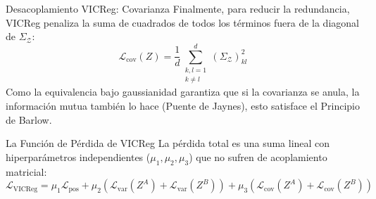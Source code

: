 \documentclass[aspectratio=169, 12pt]{beamer}
\begin{document}
\begin{frame}{Desacoplamiento VICReg: Covarianza}
Finalmente, para reducir la redundancia, VICReg penaliza la suma de cuadrados de todos los términos fuera de la diagonal de $\Sigma_\mathcal{Z}$:
\[
    \mathcal{L}_{\text{cov}}(Z) = \frac{1}{d} \sum_{\substack{k,l=1 \\ k \neq l}}^{d} (\Sigma_\mathcal{Z})_{kl}^2
\]
Como la equivalencia bajo gaussianidad garantiza que si la covarianza se anula, la información mutua también lo hace (Puente de Jaynes), esto satisface el Principio de Barlow.
\end{frame}

\begin{frame}{La Función de Pérdida de VICReg}
La pérdida total es una suma lineal con hiperparámetros independientes ($\mu_1, \mu_2, \mu_3$) que no sufren de acoplamiento matricial:
\[
    \mathcal{L}_{\text{VICReg}} = \mu_1 \mathcal{L}_{\text{pos}} + \mu_2 \left( \mathcal{L}_{\text{var}}(Z^A) + \mathcal{L}_{\text{var}}(Z^B) \right) + \mu_3 \left( \mathcal{L}_{\text{cov}}(Z^A) + \mathcal{L}_{\text{cov}}(Z^B) \right)
\]
\end{frame}
\end{document}
